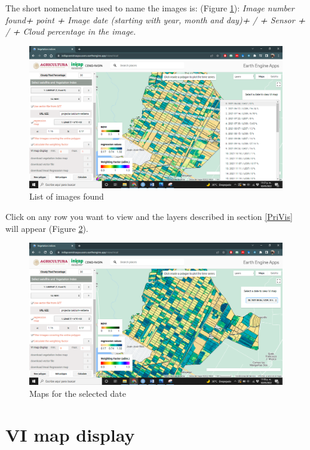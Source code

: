 \documentclass[
]{book}
\begin{document}
The short nomenclature used to name the images is: (Figure \ref{fig:figI5}): \emph{Image number found\textbf{+} point \textbf{+} Image date (starting with year, month and day)\textbf{+} / \textbf{+} Sensor \textbf{+} / \textbf{+} Cloud percentage in the image.}

\begin{figure}

{\centering \includegraphics[width=0.85\linewidth]{./images/Figure55} 

}

\caption{List of images found}\label{fig:figI5}
\end{figure}

Click on any row you want to view and the layers described in section \ref{PriVis} will appear (Figure \ref{fig:figI6}).

\begin{figure}

{\centering \includegraphics[width=0.85\linewidth]{./images/Figure56} 

}

\caption{Maps for the selected date}\label{fig:figI6}
\end{figure}

\hypertarget{vi-map-display}{%
\section{VI map display}\label{vi-map-display}}
\end{document}
